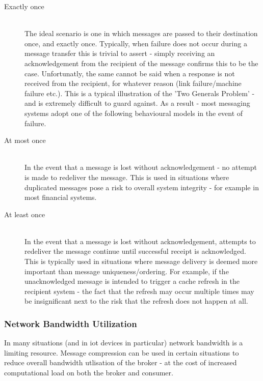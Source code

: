 \begin{description}
  \item[Exactly once] \hfill \\
    The ideal scenario is one in which messages are passed to their destination
    once, and exactly once. Typically, when failure does not occur during a
    message transfer this is trivial to assert - simply receiving an acknowledgement
    from the recipient of the message confirms this to be the case.
    Unfortunatly, the same cannot be said when a response is not received from
    the recipient, for whatever reason (link failure/machine failure etc.).
    This is a typical illustration of the
    'Two Generals Problem'\cite{Gray:1978:NDB:647433.723863} - and is extremely
    difficult to guard against. As a result - most messaging systems adopt one
    of the following behavioural models in the event of failure.
  \item[At most once] \hfill \\
    In the event that a message is lost without acknowledgement - no attempt is made
    to redeliver the message. This is used in situations where duplicated messages
    pose a risk to overall system integrity - for example in most financial systems.
  \item[At least once] \hfill \\
    In the event that a message is lost without acknowledgement, attempts to
    redeliver the message continue until successful receipt is acknowledged.
    This is typically used in situations where message delivery is deemed more
    important than message uniqueness/ordering. For example, if the unacknowledged
    message is intended to trigger a cache refresh in the recipient system - the
    fact that the refresh may occur multiple times may be insignificant next to
    the risk that the refresh does not happen at all.
\end{description}

\subsubsection{Network Bandwidth Utilization}
\label{subs:Network Bandwidth Utilization}

In many situations (and in \gls{iot} devices in particular) network bandwidth is
a limiting resource. Message compression can be used in certain situations to
reduce overall bandwidth utlisation of the broker - at the cost of increased
computational load on both the broker and consumer.

